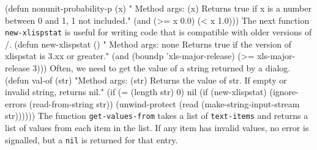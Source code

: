 (defun nonunit-probability-p (x)
" Method args: (x)
Returns true if x is a number between 0 and 1, 1 not included."
  (and (>= x 0.0) (< x 1.0)))
\eatline
{}\nwendcode{}\nwdocspar
The next function {\tt{}new-xlispstat} is useful for writing code that is
compatible with older versions of \xls/.
\nwenddocs{}\plusendmoddef
(defun new-xlispstat ()
" Method args: none
Returns true if the version of xlispstat is 3.xx or greater."
  (and (boundp 'xls-major-release) (>= xls-major-release 3)))
\eatline
{}\nwendcode{}\nwdocspar
Often, we need to get the value of a string returned by a
dialog.
\nwenddocs{}\plusendmoddef
(defun val-of (str)
"Method args: (str)
Returns the value of str. If empty or invalid string, returns nil."
  (if (= (length str) 0)
      nil
    (if (new-xlispstat)
        (ignore-errors (read-from-string str))
      (unwind-protect
          (read (make-string-input-stream str))))))
\eatline
{}\nwendcode{}\nwdocspar
The function {\tt{}get-values-from} takes a list of {\tt{}text-items} and
returns a list of values from each item in the list. If any item has
invalid values, no error is signalled, but a {\tt{}nil} is returned for
that entry.

